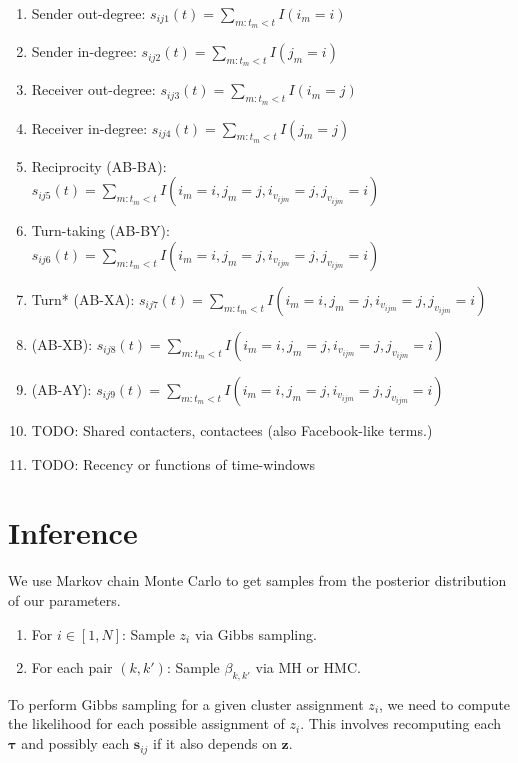 \documentclass[11pt]{article}
\begin{document}

\begin{enumerate}
\item Sender out-degree: $s_{ij1}(t) = \sum_{m:t_m<t} I(i_m=i)$
\item Sender in-degree: $s_{ij2}(t) = \sum_{m:t_m<t} I(j_m=i)$
\item Receiver out-degree: $s_{ij3}(t) = \sum_{m:t_m<t} I(i_m=j)$
\item Receiver in-degree: $s_{ij4}(t) = \sum_{m:t_m<t} I(j_m=j)$
\item Reciprocity (AB-BA): $s_{ij5}(t) = \sum_{m:t_m<t} I(i_m=i,j_m=j,i_{v_{ijm}}=j,j_{v_{ijm}}=i)$
\item Turn-taking (AB-BY): $s_{ij6}(t) = \sum_{m:t_m<t} I(i_m=i,j_m=j,i_{v_{ijm}}=j,j_{v_{ijm}}=i)$
\item Turn* (AB-XA): $s_{ij7}(t) = \sum_{m:t_m<t} I(i_m=i,j_m=j,i_{v_{ijm}}=j,j_{v_{ijm}}=i)$
\item  (AB-XB): $s_{ij8}(t) = \sum_{m:t_m<t} I(i_m=i,j_m=j,i_{v_{ijm}}=j,j_{v_{ijm}}=i)$
\item  (AB-AY): $s_{ij9}(t) = \sum_{m:t_m<t} I(i_m=i,j_m=j,i_{v_{ijm}}=j,j_{v_{ijm}}=i)$
\item TODO: Shared contacters, contactees (also Facebook-like terms.) 
\item TODO: Recency or functions of time-windows
\end{enumerate}


\section{Inference}

We use Markov chain Monte Carlo to get samples from the posterior distribution of our parameters.  

\begin{enumerate}
\item For $i \in [1,N]$: Sample $z_i$ via Gibbs sampling.
\item For each pair $(k,k')$: Sample $\beta_{k,k'}$ via MH or HMC.
\end{enumerate}

To perform Gibbs sampling for a given cluster assignment $z_i$, we need to compute the likelihood for each possible assignment of $z_i$.  This involves recomputing each $\boldsymbol{\tau}$ and possibly each $\mathbf{s}_{ij}$ if it also depends on $\mathbf{z}$.
\end{document}
